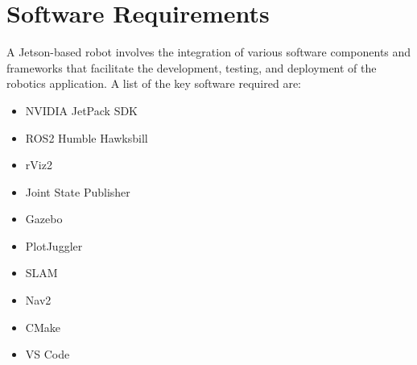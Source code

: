 \section{\fontsize{14}{16} Software Requirements}
{
	\fontsize{12}{14}
	A Jetson-based robot involves the integration of various software components and
	frameworks that facilitate the development, testing, and deployment of the robotics application.
	A list of the key software required are:
	
	\begin{itemize}
		\item NVIDIA JetPack SDK
		
		\item ROS2 Humble Hawksbill
		
		\item rViz2
		
		\item Joint State Publisher
		
		\item Gazebo
		
		\item PlotJuggler
		
		\item SLAM
		
		\item Nav2
		
		\item CMake
		
		\item VS Code
	\end{itemize}
		
}

